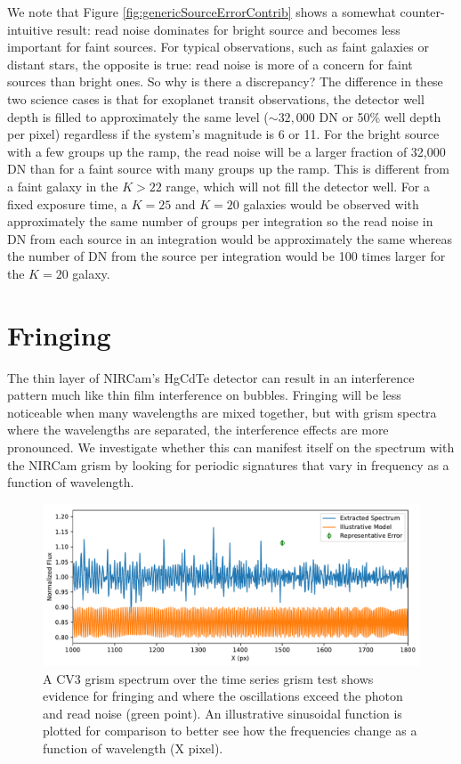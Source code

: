 \documentclass[]{aastex62}
\begin{document}
We note that Figure \ref{fig:genericSourceErrorContrib} shows a somewhat counter-intuitive result: read noise dominates for bright source and becomes less important for faint sources.
For typical observations, such as faint galaxies or distant stars, the opposite is true: read noise is more of a concern for faint sources than bright ones.
So why is there a discrepancy?
The difference in these two science cases is that for exoplanet transit observations, the detector well depth is filled to approximately the same level ($\sim 32,000$ DN or 50\% well depth per pixel) regardless if the system's magnitude is 6 or 11.
For the bright source with a few groups up the ramp, the read noise will be a larger fraction of 32,000 DN than for a faint source with many groups up the ramp.
This is different from a faint galaxy in the $K > 22$ range, which will not fill the detector well.
For a fixed exposure time, a $K=25$ and $K=20$ galaxies would be observed with approximately the same number of groups per integration so the read noise in DN from each source in an integration would be approximately the same whereas the number of DN from the source per integration would be 100 times larger for the $K=20$ galaxy.

\section{Fringing}

The thin layer of NIRCam's HgCdTe detector can result in an interference pattern much like thin film interference on bubbles.
Fringing will be less noticeable when many wavelengths are mixed together, but with grism spectra where the wavelengths are separated, the interference effects are more pronounced.
We investigate whether this can manifest itself on the spectrum with the NIRCam grism by looking for periodic signatures that vary in frequency as a function of wavelength.

\begin{figure}[!hbtp]
\centering
\includegraphics[width=.99\columnwidth]{fringing_grism_cv3.pdf}
\caption{A CV3 grism spectrum over the time series grism test shows evidence for fringing and where the oscillations exceed the photon and read noise (green point).
An illustrative sinusoidal function is plotted for comparison to better see how the frequencies change as a function of wavelength (X pixel).
}\label{fig:CV3GrismSpecFringing}
\end{figure}
\end{document}
